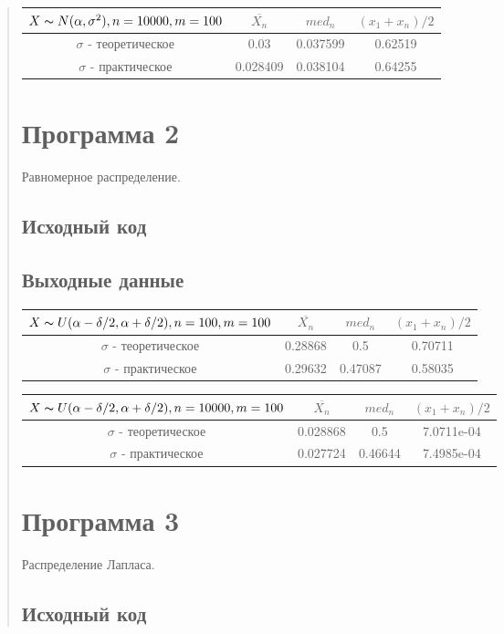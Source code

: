\documentclass{article}
\begin{document}
\begin{quote}
\begin{tabular}{ | c | c | c | c | }
\hline
$X \thicksim N(\alpha, \sigma^2), n = 10000, m = 100$ & $\overline{X_n}$ & $med_n$ & $(x_1 + x_n) / 2$ \\ \hline
$\sigma$ - теоретическое & 0.03 & 0.037599 & 0.62519 \\ \hline
$\sigma$ - практическое & 0.028409 & 0.038104 & 0.64255 \\
\hline
\end{tabular}
\section{Программа 2}
	Равномерное распределение. \\
\subsection{Исходный код}
	
\subsection{Выходные данные}
\begin{tabular}{ | c | c | c | c | }
\hline
$X \thicksim U(\alpha - \delta / 2, \alpha + \delta / 2), n = 100, m = 100$ & $\overline{X_n}$ & $med_n$ & $(x_1 + x_n) / 2$ \\ \hline
$\sigma$ - теоретическое & 0.28868 & 0.5 & 0.70711 \\ \hline
$\sigma$ - практическое & 0.29632 & 0.47087 & 0.58035 \\
\hline
\end{tabular}

\begin{tabular}{ | c | c | c | c | } 
\hline
$X \thicksim U(\alpha - \delta / 2, \alpha + \delta / 2), n = 10000, m = 100$ & $\overline{X_n}$ & $med_n$ & $(x_1 + x_n) / 2$ \\ \hline
$\sigma$ - теоретическое & 0.028868 & 0.5 & 7.0711e-04 \\ \hline
$\sigma$ - практическое & 0.027724 & 0.46644 & 7.4985e-04 \\
\hline
\end{tabular}
\section{Программа 3}
        Распределение Лапласа. \\
\subsection{Исходный код}
        

\end{quote}
\end{document}
